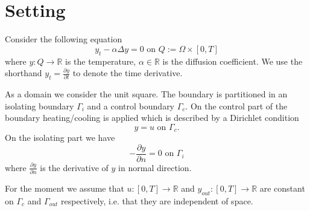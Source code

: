 \documentclass[
12pt, %
a4paper, %
onecolumn, %
portrait %
]{article}
\begin{document}
\pagestyle{myheadings} %
\markright{\doctitle} %


\thispagestyle{plain} %

\printtitle %

\section{Setting}
Consider the following equation
\begin{equation}
y_t -  \alpha \Delta y = 0 \text{ on } Q := \Omega \times [0,T]
\label{eq:pde}
\end{equation}
where $y : Q \rightarrow \mathbb{R}$ is the temperature, $\alpha \in \mathbb{R}$ is the diffusion coefficient. We use the shorthand $y_t = \frac{\partial y}{\partial t}$ to denote the time derivative.
 
As a domain we consider the unit square. The boundary is partitioned in an isolating boundary $\Gamma_i$ and a control boundary $\Gamma_c$.
On the control part of the boundary heating/cooling is applied which is described by a Dirichlet condition
\begin{equation}
y = u \text{ on } \Gamma_c.
\end{equation}
On the isolating part we have
\begin{equation}
- \frac{\partial y}{\partial n} = 0 \text{ on } \Gamma_i
\end{equation}
where $\frac{\partial y}{\partial n}$ is the derivative of $y$ in normal direction.

\begin{center}
\end{center}
For the moment we assume that $u : [0, T] \rightarrow \mathbb{R}$ and $y_{out} : [0,T] \rightarrow \mathbb{R}$ are constant on $\Gamma_c$ and $\Gamma_{out}$ respectively, i.e. that they are independent of space.
\end{document}
